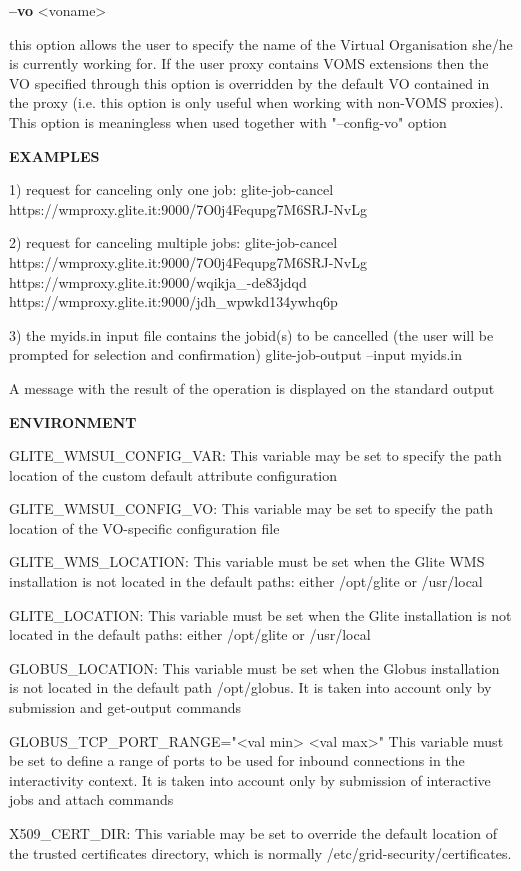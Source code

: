 {\textbf{--vo} <voname>

this option allows the user to specify the name of the Virtual Organisation she/he is currently working for.
If the user proxy contains VOMS extensions then the VO specified through this option is overridden by the default VO contained in the proxy (i.e. this option is only useful when working with non-VOMS proxies).
This option is meaningless when used together with "--config-vo" option


\medskip
\textbf{EXAMPLES}
\smallskip


1) request for canceling only one job:
glite-job-cancel https://wmproxy.glite.it:9000/7O0j4Fequpg7M6SRJ-NvLg

2)	request for canceling multiple jobs:
glite-job-cancel https://wmproxy.glite.it:9000/7O0j4Fequpg7M6SRJ-NvLg https://wmproxy.glite.it:9000/wqikja\_-de83jdqd https://wmproxy.glite.it:9000/jdh\_wpwkd134ywhq6p

3)	the myids.in input file contains the jobid(s) to be cancelled (the user will be prompted for selection and confirmation)
glite-job-output --input myids.in

A message with the result of the operation is displayed on the standard output

\medskip
\textbf{ENVIRONMENT}
\smallskip


GLITE\_WMSUI\_CONFIG\_VAR:  This variable may be set to specify the path location of the custom default attribute configuration

GLITE\_WMSUI\_CONFIG\_VO: This variable may be set to specify the path location of the VO-specific configuration file

GLITE\_WMS\_LOCATION:  This variable must be set when the Glite WMS installation is not located in the default paths: either /opt/glite or /usr/local

GLITE\_LOCATION: This variable must be set when the Glite installation is not located in the default paths: either /opt/glite or /usr/local


GLOBUS\_LOCATION: This variable must be set when the Globus installation is not located in the default path /opt/globus.
It is taken into account only by submission and get-output commands

GLOBUS\_TCP\_PORT\_RANGE="<val min> <val max>" This variable must be set to define a range of ports to be used for inbound connections in the interactivity context.
It is taken into account only by submission of interactive jobs and attach commands

X509\_CERT\_DIR: This variable may be set to override the default location of the trusted certificates directory, which is normally /etc/grid-security/certificates.

}
